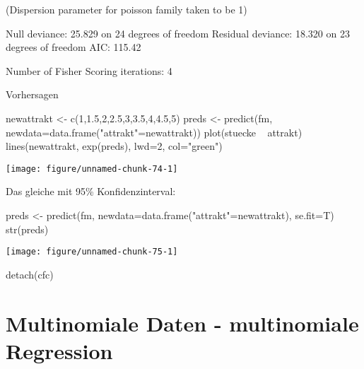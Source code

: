 \documentclass[a4paper,twoside]{tufte-book}\usepackage[]{graphicx}\usepackage[]{color}
\makeatletter
\def\maxwidth{ %
  \ifdim\Gin@nat@width>\linewidth
    \linewidth
  \else
    \Gin@nat@width
  \fi
}
\makeatother
\begin{document}
\begin{appendices}
\begin{Schunk}
\begin{Soutput}
(Dispersion parameter for poisson family taken to be 1)

    Null deviance: 25.829  on 24  degrees of freedom
Residual deviance: 18.320  on 23  degrees of freedom
AIC: 115.42

Number of Fisher Scoring iterations: 4
\end{Soutput}
\end{Schunk}

Vorhersagen

\begin{Schunk}
\begin{Sinput}
newattrakt <- c(1,1.5,2,2.5,3,3.5,4,4.5,5)
preds <- predict(fm, newdata=data.frame("attrakt"=newattrakt))
plot(stuecke ~ attrakt)
lines(newattrakt, exp(preds), lwd=2, col="green")
\end{Sinput}

\texttt{[image: figure/unnamed-chunk-74-1]} \end{Schunk}

Das gleiche mit 95\% Konfidenzinterval:

\begin{Schunk}
\begin{Sinput}
preds <- predict(fm, newdata=data.frame("attrakt"=newattrakt), se.fit=T)
str(preds)
\end{Sinput}

\texttt{[image: figure/unnamed-chunk-75-1]} \begin{Sinput}
detach(cfc)
\end{Sinput}
\end{Schunk}



\section{Multinomiale Daten - multinomiale Regression}


\end{appendices}
\end{document}
